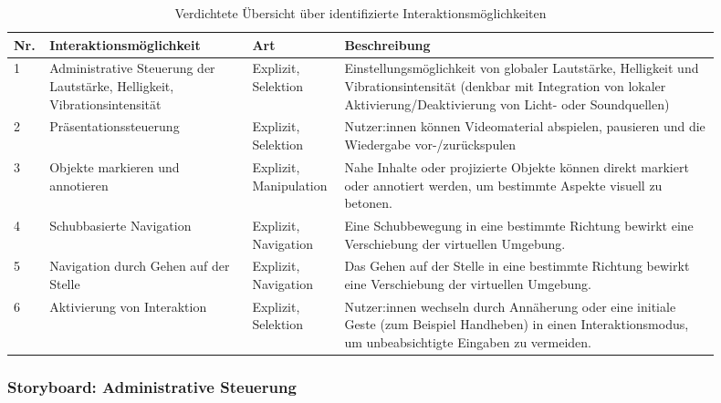 \begin{table}[!htbp]
    \centering
    \small
    \caption{Verdichtete Übersicht über identifizierte Interaktionsmöglichkeiten}
    \begin{tabular}{p{0.03\linewidth} >{\raggedright\arraybackslash}p{0.27\linewidth} >{\raggedright\arraybackslash}p{0.1\linewidth}
            >{\raggedright\arraybackslash}p{0.5\linewidth}}
        \toprule
        \textbf {Nr.} & \textbf{Interaktions\-möglichkeit} & \textbf{Art} & \textbf{Beschreibung} \\
        \midrule
        1 & Administrative Steuerung der Laut\-stärke, Helligkeit, Vibrations\-inten\-sität & Explizit, Selektion & Einstellungsmöglichkeit von globaler Lautstärke, Helligkeit und Vibrationsintensität (denkbar mit Integration von lokaler Aktivierung/Deaktivierung von Licht- oder Soundquellen) \\

        2 & Präsentations\-steuerung & Explizit, Selektion & Nutzer:innen können Videomaterial abspielen, pausieren und die Wiedergabe vor-/zurückspulen \\

        3 & Objekte markieren und annotieren & Explizit, Manipulation & Nahe Inhalte oder projizierte Objekte können direkt markiert oder annotiert werden, um bestimmte Aspekte visuell zu betonen. \\

        4 & Schubbasierte Navigation & Explizit, Navigation & Eine Schubbewegung in eine bestimmte Richtung bewirkt eine Verschiebung der virtuellen Umgebung. \\

        5 & Navigation durch Gehen auf der Stelle & Explizit, Navigation & Das Gehen auf der Stelle in eine bestimmte Richtung bewirkt eine Verschiebung der virtuellen Umgebung. \\

        6 & Aktivierung von Interaktion & Explizit, Selektion & Nutzer:innen wechseln durch Annäherung oder eine initiale Geste (zum Beispiel Handheben) in einen Interaktionsmodus, um unbeabsichtigte Eingaben zu vermeiden. \\

        \bottomrule
    \end{tabular}
    \label{tab:interaktionsmoeglichkeiten}
\end{table}


\subsubsection{Storyboard: Administrative Steuerung}
\label{sec:storyboard}

